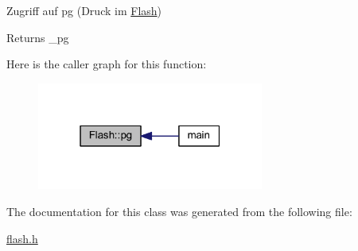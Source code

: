 Zugriff auf pg (Druck im \mbox{\hyperlink{class_flash}{Flash}}) 

\begin{DoxyReturn}{Returns}
\+\_\+pg 
\end{DoxyReturn}
Here is the caller graph for this function\+:\nopagebreak
\begin{figure}[H]
\begin{center}
\leavevmode
\includegraphics[width=211pt]{class_flash_ac3cec3cdb03bd71e7b32d7e77a209308_icgraph}
\end{center}
\end{figure}


The documentation for this class was generated from the following file\+:\begin{DoxyCompactItemize}
\item 
\mbox{\hyperlink{flash_8h}{flash.\+h}}\end{DoxyCompactItemize}
